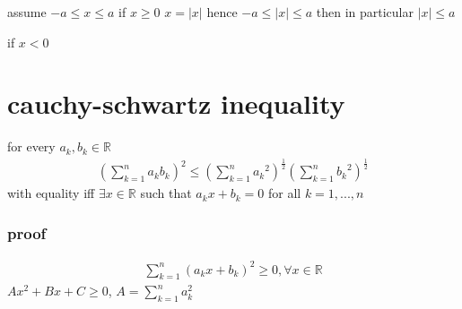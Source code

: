 \documentclass[letterpaper]{article}
\newcommand{\abs}[1]{\left\lvert #1 \right\rvert}
\begin{document}
assume $-a\le x\le a$ if $x\ge 0$ $x=\left\lvert x\right\rvert$ hence $-a\le\abs{x}\le a$ then in particular $\abs{x}\le a$

if $x<0$

\section*{cauchy-schwartz inequality}
for every $a_k,b_k\in\mathbb{R}$
\begin{align*}
  \left(\sum\limits_{k=1}^n{a_kb_k}\right)^2\le\left(\sum\limits_{k=1}^n{{a_k}^2}\right)^{\frac{1}{2}}\left(\sum\limits_{k=1}^n{{b_k}^2}\right)^{\frac{1}{2}}
\end{align*}
with equality iff $\exists x \in \mathbb{R}$ such that $a_kx+b_k=0$ for all $k=1,...,n$
\subsubsection*{proof}
\begin{align*}
  \sum\limits_{k=1}^n{\left(a_kx+b_k\right)^2}\ge 0, \forall x \in \mathbb{R}
\end{align*}
$Ax^2+Bx+C\ge0$, $A=\sum\limits_{k=1}^n{a_k^2}$
\end{document}
